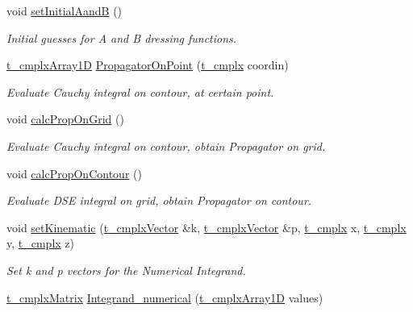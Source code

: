 \begin{DoxyCompactItemize}
void \hyperlink{class_c___quark_a9bd2e345fa3034850454c5eae8ca585a}{set\-Initial\-Aand\-B} ()
\begin{DoxyCompactList}\small\item\em Initial guesses for A and B dressing functions. \end{DoxyCompactList}\item 
\hyperlink{types_8h_aab52f79903881ec15d289b3dbfb102fd}{t\-\_\-cmplx\-Array1\-D} \hyperlink{class_c___quark_a80d1fb9d4107a67eae72c87e3653e7ef}{Propagator\-On\-Point} (\hyperlink{types_8h_aa75ae339052372f671bb263e6a272e82}{t\-\_\-cmplx} coordin)
\begin{DoxyCompactList}\small\item\em Evaluate Cauchy integral on contour, at certain point. \end{DoxyCompactList}\item 
void \hyperlink{class_c___quark_aed45d2fb4598cbb55b3fef5edcc6e826}{calc\-Prop\-On\-Grid} ()
\begin{DoxyCompactList}\small\item\em Evaluate Cauchy integral on contour, obtain Propagator on grid. \end{DoxyCompactList}\item 
void \hyperlink{class_c___quark_abade7bfefe26cdb91a1d8a8583879fff}{calc\-Prop\-On\-Contour} ()
\begin{DoxyCompactList}\small\item\em Evaluate D\-S\-E integral on grid, obtain Propagator on contour. \end{DoxyCompactList}\item 
void \hyperlink{class_c___quark_a3aa1d8e442cd1e051ed8e1deb37868e0}{set\-Kinematic} (\hyperlink{types_8h_ae8d0d77d0edff801ba45e425c85cf87d}{t\-\_\-cmplx\-Vector} \&k, \hyperlink{types_8h_ae8d0d77d0edff801ba45e425c85cf87d}{t\-\_\-cmplx\-Vector} \&p, \hyperlink{types_8h_aa75ae339052372f671bb263e6a272e82}{t\-\_\-cmplx} x, \hyperlink{types_8h_aa75ae339052372f671bb263e6a272e82}{t\-\_\-cmplx} y, \hyperlink{types_8h_aa75ae339052372f671bb263e6a272e82}{t\-\_\-cmplx} z)
\begin{DoxyCompactList}\small\item\em Set k and p vectors for the Numerical Integrand. \end{DoxyCompactList}\item 
\hyperlink{types_8h_a24d30fabb53c3b88ffb2af3ce415e9df}{t\-\_\-cmplx\-Matrix} \hyperlink{class_c___quark_a9f6b8538c2c1b9af29a5c063b26ec7d8}{Integrand\-\_\-numerical} (\hyperlink{types_8h_aab52f79903881ec15d289b3dbfb102fd}{t\-\_\-cmplx\-Array1\-D} values)

\end{DoxyCompactItemize}
